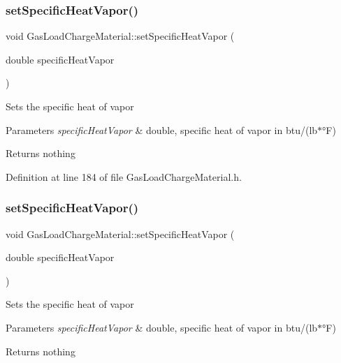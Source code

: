 \subsubsection{\texorpdfstring{set\+Specific\+Heat\+Vapor()}{setSpecificHeatVapor()}\hspace{0.1cm}{\footnotesize\ttfamily [2/3]}}
{\footnotesize\ttfamily void Gas\+Load\+Charge\+Material\+::set\+Specific\+Heat\+Vapor (\begin{DoxyParamCaption}\item[{double}]{specific\+Heat\+Vapor }\end{DoxyParamCaption})\hspace{0.3cm}{\ttfamily [inline]}}

Sets the specific heat of vapor


\begin{DoxyParams}{Parameters}
{\em specific\+Heat\+Vapor} & double, specific heat of vapor in btu/(lb$\ast$°F)\\
\hline
\end{DoxyParams}
\begin{DoxyReturn}{Returns}
nothing 
\end{DoxyReturn}


Definition at line 184 of file Gas\+Load\+Charge\+Material.\+h.

\mbox{\label{class_gas_load_charge_material_a7498eba84bb8bdfc5344f0e44418260b}} 
\subsubsection{\texorpdfstring{set\+Specific\+Heat\+Vapor()}{setSpecificHeatVapor()}\hspace{0.1cm}{\footnotesize\ttfamily [3/3]}}
{\footnotesize\ttfamily void Gas\+Load\+Charge\+Material\+::set\+Specific\+Heat\+Vapor (\begin{DoxyParamCaption}\item[{double}]{specific\+Heat\+Vapor }\end{DoxyParamCaption})\hspace{0.3cm}{\ttfamily [inline]}}

Sets the specific heat of vapor


\begin{DoxyParams}{Parameters}
{\em specific\+Heat\+Vapor} & double, specific heat of vapor in btu/(lb$\ast$°F)\\
\hline
\end{DoxyParams}
\begin{DoxyReturn}{Returns}
nothing 
\end{DoxyReturn}


